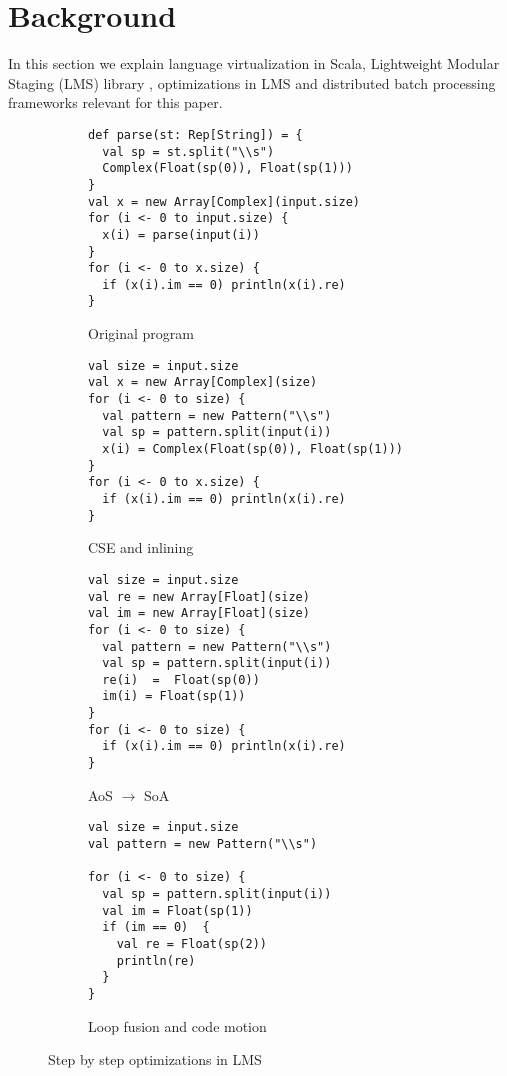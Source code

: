 \section{Background}
\label{sec:background}
In this section we explain language virtualization in Scala, Lightweight Modular
Staging (LMS) library \cite{rompf_lightweight_2010, rompf_lightweight_2012},
optimizations in LMS and distributed batch processing frameworks
relevant for this paper.
\begin{figure*}
  \begin{subfigure}[b]{.5\linewidth}
\begin{lstlisting}
def parse(st: Rep[String]) = {               
  val sp = st.split("\\s")
  Complex(Float(sp(0)), Float(sp(1)))
}
val x = new Array[Complex](input.size)
for (i <- 0 to input.size) {
  x(i) = parse(input(i)) 
}
for (i <- 0 to x.size) {
  if (x(i).im == 0) println(x(i).re) 
}
\end{lstlisting}
    \caption{Original program}
    \label{lst:original}
  \end{subfigure}
  \begin{subfigure}[b]{.5\linewidth}
\begin{lstlisting}
val size = input.size
val x = new Array[Complex](size)
for (i <- 0 to size) {
  val pattern = new Pattern("\\s") 
  val sp = pattern.split(input(i))
  x(i) = Complex(Float(sp(0)), Float(sp(1))) 
}
for (i <- 0 to x.size) {
  if (x(i).im == 0) println(x(i).re) 
}
\end{lstlisting}
    \caption{CSE and inlining} 
    \label{lst:cse-inline}
  \end{subfigure}
  \begin{subfigure}[b]{.5\linewidth}
\begin{lstlisting}
val size = input.size
val re = new Array[Float](size)
val im = new Array[Float](size)
for (i <- 0 to size) {
  val pattern = new Pattern("\\s") 
  val sp = pattern.split(input(i))
  re(i)  =  Float(sp(0))
  im(i) = Float(sp(1)) 
}
for (i <- 0 to size) {
  if (x(i).im == 0) println(x(i).re) 
}
\end{lstlisting}
    \caption{AoS $\rightarrow$ SoA}
    \label{lst:aos-soa}
  \end{subfigure}
\begin{subfigure}[b]{.5\linewidth}
\begin{lstlisting}
val size = input.size
val pattern = new Pattern("\\s")
 
for (i <- 0 to size) {
  val sp = pattern.split(input(i))
  val im = Float(sp(1))
  if (im == 0)  {
    val re = Float(sp(2))
    println(re)
  }
}
\end{lstlisting}
    \caption{Loop fusion and code motion}
    \label{lst:fusion-motion}
  \end{subfigure}
  \caption{Step by step optimizations in LMS}
  \label{lst:step-by-step-lms}
\end{figure*}

